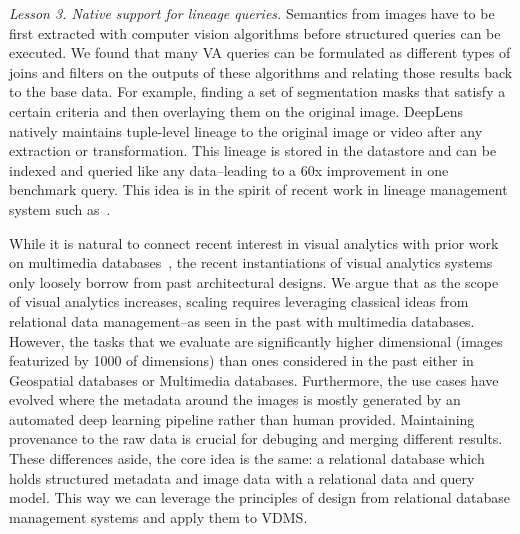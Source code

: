 \vspace{0.5em} \noindent \emph{Lesson 3. Native support for lineage queries. } Semantics from images have to be first extracted with computer vision algorithms before structured queries can be executed. We found that many VA queries can be formulated as different types of joins and filters on the outputs of these algorithms and relating those results back to the base data. For example, finding a set of segmentation masks that satisfy a certain criteria and then overlaying them on the original image.
\textsf{DeepLens} natively maintains tuple-level lineage to the original image or video after any extraction or transformation. This lineage is stored in the datastore and can be indexed and queried like any data--leading to a 60x improvement in one benchmark query.
This idea is in the spirit of recent work in lineage management system such as~\cite{psallidas2018smoke}.


\vspace{0.75em}

While it is natural to connect recent interest in visual analytics with prior work on multimedia databases~\cite{yoshitaka1999survey}, the recent instantiations of visual analytics systems only loosely borrow from past architectural designs.
We argue that as the scope of  visual analytics increases, scaling requires leveraging classical ideas from relational data management--as seen in the past with multimedia databases.
However, the tasks that we evaluate are significantly higher dimensional (images featurized by 1000 of dimensions) than ones considered in the past either in Geospatial databases or Multimedia databases.
Furthermore, the use cases have evolved where the metadata around the images is mostly generated by an automated deep learning pipeline rather than human provided.
Maintaining provenance to the raw data is crucial for debuging and merging different results. 
These differences aside, the core idea is the same: a relational database which holds structured metadata and image data with a relational data and query model. 
This way we can leverage the principles of design from relational database management systems and apply them to VDMS.











